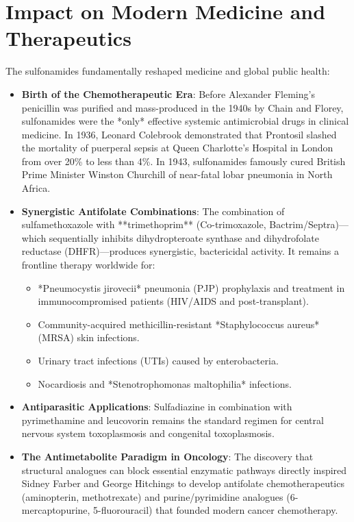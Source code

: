 \section{Impact on Modern Medicine and Therapeutics}

The sulfonamides fundamentally reshaped medicine and global public health:
\begin{itemize}
    \item \textbf{Birth of the Chemotherapeutic Era}: Before Alexander Fleming's penicillin was purified and mass-produced in the 1940s by Chain and Florey, sulfonamides were the *only* effective systemic antimicrobial drugs in clinical medicine. In 1936, Leonard Colebrook demonstrated that Prontosil slashed the mortality of puerperal sepsis at Queen Charlotte's Hospital in London from over 20\% to less than 4\%. In 1943, sulfonamides famously cured British Prime Minister Winston Churchill of near-fatal lobar pneumonia in North Africa.
    \item \textbf{Synergistic Antifolate Combinations}: The combination of sulfamethoxazole with **trimethoprim** (Co-trimoxazole, Bactrim/Septra)—which sequentially inhibits dihydropteroate synthase and dihydrofolate reductase (DHFR)—produces synergistic, bactericidal activity. It remains a frontline therapy worldwide for:
      \begin{itemize}
          \item *Pneumocystis jirovecii* pneumonia (PJP) prophylaxis and treatment in immunocompromised patients (HIV/AIDS and post-transplant).
          \item Community-acquired methicillin-resistant *Staphylococcus aureus* (MRSA) skin infections.
          \item Urinary tract infections (UTIs) caused by enterobacteria.
          \item Nocardiosis and *Stenotrophomonas maltophilia* infections.
      \end{itemize}
    \item \textbf{Antiparasitic Applications}: Sulfadiazine in combination with pyrimethamine and leucovorin remains the standard regimen for central nervous system toxoplasmosis and congenital toxoplasmosis.
    \item \textbf{The Antimetabolite Paradigm in Oncology}: The discovery that structural analogues can block essential enzymatic pathways directly inspired Sidney Farber and George Hitchings to develop antifolate chemotherapeutics (aminopterin, methotrexate) and purine/pyrimidine analogues (6-mercaptopurine, 5-fluorouracil) that founded modern cancer chemotherapy.
\end{itemize}

